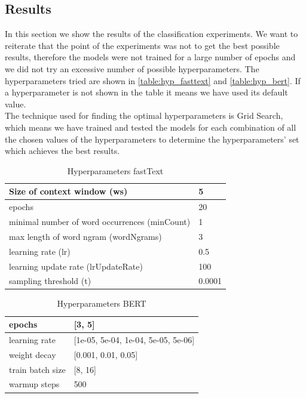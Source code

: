 \subsection{Results}
In this section we show the results of the classification experiments. We want to reiterate that the point of the experiments was not to get the best possible results, therefore the models were not trained for a large number of epochs and we did not try an excessive number of possible hyperparameters.
The hyperparameters tried are shown in \autoref{table:hyp_fasttext} and \autoref{table:hyp_bert}. If a hyperparameter is not shown in the table it means we have used its default value. \\
The technique used for finding the optimal hyperparameters is Grid Search, which means we have trained and tested the models for each combination of all the chosen values of the hyperparameters to determine the hyperparameters' set which achieves the best results.

\begin{table}[h]
  \begin{tabular}{|l|l|}
  \hline
  Size of context window (ws)                   & 5      \\ \hline
  epochs                                        & 20     \\ \hline
  minimal number of word occurrences (minCount) & 1      \\ \hline
  max length of word ngram (wordNgrams)         & 3      \\ \hline
  learning rate (lr)                            & 0.5    \\ \hline
  learning update rate (lrUpdateRate)           & 100    \\ \hline
  sampling threshold (t)                        & 0.0001 \\ \hline
  \end{tabular}
  \caption{Hyperparameters fastText}\label{table:hyp_fasttext}
\end{table}

\begin{table}[h]
  \begin{tabular}{|l|l|}
  \hline
  epochs           & {[}3, 5{]}                              \\ \hline
  learning rate    & {[}1e-05, 5e-04, 1e-04, 5e-05, 5e-06{]} \\ \hline
  weight decay     & {[}0.001, 0.01, 0.05{]}                 \\ \hline
  train batch size & {[}8, 16{]}                             \\ \hline
  warmup steps     & 500                                     \\ \hline
  \end{tabular}
  \caption{Hyperparameters BERT}\label{table:hyp_bert}
  \end{table}

